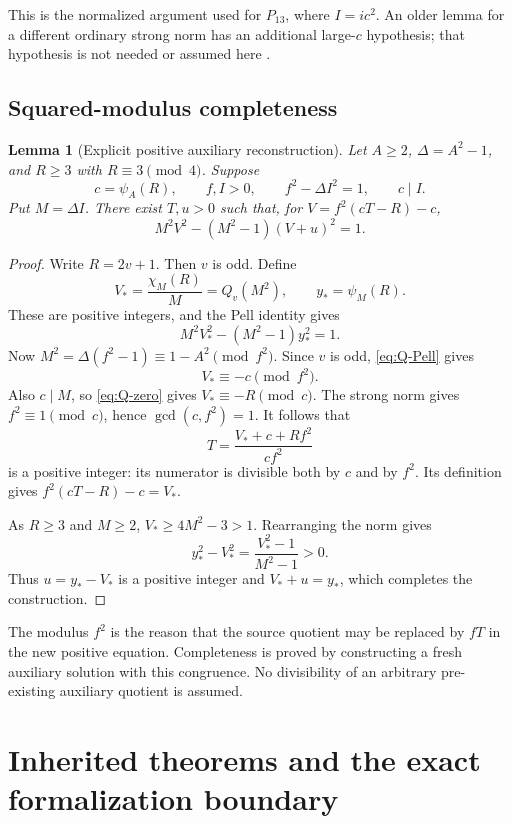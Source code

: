 \documentclass[11pt,a4paper]{article}
\newtheorem{lemma}[theorem]{Lemma}
\theoremstyle{definition}
\begin{document}
This is the normalized argument used for \(P_{13}\), where \(I=ic^2\).
An older lemma for a different ordinary strong norm has an additional
large-\(c\) hypothesis; that hypothesis is not needed or assumed here
\cite{signed-index,pell-audit}.

\subsection{Squared-modulus completeness}

\begin{lemma}[Explicit positive auxiliary reconstruction]
\label{lem:squared-completeness}
Let \(A\ge2\), \(\Delta=A^2-1\), and \(R\ge3\) with
\(R\equiv3\pmod4\).  Suppose
\[
 c=\psi_A(R),\qquad f,I>0,\qquad
 f^2-\Delta I^2=1,\qquad c\mid I.
\]
Put \(M=\Delta I\).  There exist \(T,u>0\) such that, for
\(V=f^2(cT-R)-c\),
\[
 M^2V^2-(M^2-1)(V+u)^2=1.
\]
\end{lemma}

\begin{proof}
Write \(R=2v+1\).  Then \(v\) is odd.  Define
\[
 V_*=\frac{\chi_M(R)}{M}=Q_v(M^2),
 \qquad y_*=\psi_M(R).
\]
These are positive integers, and the Pell identity gives
\[
 M^2V_*^2-(M^2-1)y_*^2=1.
\]
Now \(M^2=\Delta(f^2-1)\equiv1-A^2\pmod{f^2}\).
Since \(v\) is odd, \eqref{eq:Q-Pell} gives
\[
 V_*\equiv-c\pmod{f^2}.
\]
Also \(c\mid M\), so \eqref{eq:Q-zero} gives
\(V_*\equiv-R\pmod c\).
The strong norm gives \(f^2\equiv1\pmod c\), hence
\(\gcd(c,f^2)=1\).  It follows that
\[
 T=\frac{V_*+c+Rf^2}{cf^2}
\]
is a positive integer: its numerator is divisible both by \(c\) and
by \(f^2\).  Its definition gives \(f^2(cT-R)-c=V_*\).

As \(R\ge3\) and \(M\ge2\),
\(V_*\ge4M^2-3>1\).  Rearranging the norm gives
\[
 y_*^2-V_*^2=\frac{V_*^2-1}{M^2-1}>0.
\]
Thus \(u=y_*-V_*\) is a positive integer and \(V_*+u=y_*\),
which completes the construction.
\end{proof}

The modulus \(f^2\) is the reason that the source quotient may be
replaced by \(fT\) in the new positive equation.  Completeness is proved
by constructing a fresh auxiliary solution with this congruence.
No divisibility of an arbitrary pre-existing auxiliary quotient is
assumed.







\section{Inherited theorems and the exact formalization boundary}
\label{sec:proof-status}
\end{document}
